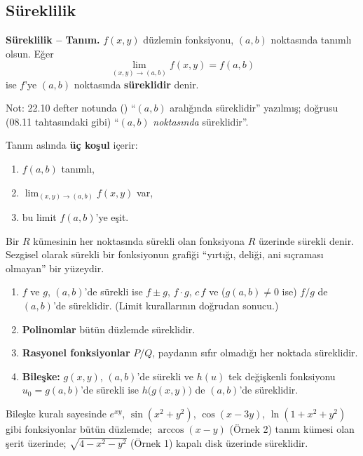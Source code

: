 \subsection{Süreklilik}

\begin{tahta}
\textbf{Süreklilik -- Tanım.} $f(x,y)$ düzlemin fonksiyonu, $(a,b)$ noktasında tanımlı olsun. Eğer
\[
\lim_{(x,y)\to(a,b)}f(x,y)=f(a,b)
\]
ise $f$'ye $(a,b)$ noktasında \textbf{süreklidir} denir.
\end{tahta}

{\small\color{gri} Not: 22.10 defter notunda () ``$(a,b)$ aralığında süreklidir'' yazılmış;
doğrusu (08.11 tahtasındaki gibi) ``$(a,b)$ \emph{noktasında} süreklidir''.}

Tanım aslında \textbf{üç koşul} içerir:
\begin{enumerate}
  \item $f(a,b)$ tanımlı,
  \item $\displaystyle\lim_{(x,y)\to(a,b)}f(x,y)$ var,
  \item bu limit $f(a,b)$'ye eşit.
\end{enumerate}
Bir $R$ kümesinin her noktasında sürekli olan fonksiyona $R$ üzerinde sürekli denir. Sezgisel olarak sürekli bir
fonksiyonun grafiği ``yırtığı, deliği, ani sıçraması olmayan'' bir yüzeydir.

\begin{teorem}
\begin{enumerate}
  \item $f$ ve $g$, $(a,b)$'de sürekli ise $f\pm g$, $f\cdot g$, $c\,f$ ve ($g(a,b)\neq0$ ise) $f/g$ de $(a,b)$'de
        süreklidir. (Limit kurallarının doğrudan sonucu.)
  \item \textbf{Polinomlar} bütün düzlemde süreklidir.
  \item \textbf{Rasyonel fonksiyonlar} $P/Q$, paydanın sıfır olmadığı her noktada süreklidir.
  \item \textbf{Bileşke:} $g(x,y)$, $(a,b)$'de sürekli ve $h(u)$ tek değişkenli fonksiyonu $u_0=g(a,b)$'de sürekli ise
        $h\big(g(x,y)\big)$ de $(a,b)$'de süreklidir.
\end{enumerate}
\end{teorem}

Bileşke kuralı sayesinde $e^{xy}$, $\sin(x^2+y^2)$, $\cos(x-3y)$, $\ln(1+x^2+y^2)$ gibi fonksiyonlar bütün düzlemde;
$\arccos(x-y)$ (Örnek 2) tanım kümesi olan şerit üzerinde; $\sqrt{4-x^2-y^2}$ (Örnek 1) kapalı disk üzerinde süreklidir.

